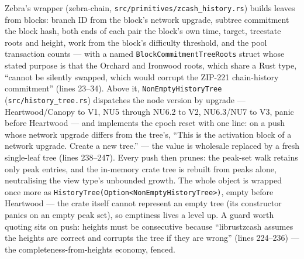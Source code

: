 \documentclass[11pt,a4paper]{article}
\theoremstyle{definition}
\begin{document}
Zebra's wrapper (\textsf{zebra-chain},
\texttt{src/primitives/zcash\_history.rs}) builds leaves from blocks:
branch ID from the block's network upgrade, subtree commitment the block
hash, both ends of each pair the block's own time, target, treestate
roots and height, work from the block's difficulty threshold, and the
pool transaction counts --- with a named
\texttt{BlockCommitmentTreeRoots} struct whose stated purpose is that
the Orchard and Ironwood roots, which share a Rust type, ``cannot be
silently swapped, which would corrupt the ZIP-221 chain-history
commitment'' (lines 23--34). Above it,
\texttt{NonEmptyHistoryTree} (\texttt{src/history\_tree.rs}) dispatches
the node version by upgrade --- Heartwood/Canopy to V1, NU5 through
NU6.2 to V2, NU6.3/NU7 to V3, panic before Heartwood --- and implements
the epoch reset with one line: on a push whose network upgrade differs
from the tree's, ``This is the activation block of a network upgrade.
Create a new tree.'' --- the value is wholesale replaced by a fresh
single-leaf tree (lines 238--247). Every push then prunes: the peak-set
walk retains only peak entries, and the in-memory crate tree is rebuilt
from peaks alone, neutralising the view type's unbounded growth. The
whole object is wrapped once more as
\texttt{HistoryTree(Option<NonEmptyHistoryTree>)}, empty before
Heartwood --- the crate itself cannot represent an empty tree (its
constructor panics on an empty peak set), so emptiness lives a level up.
A guard worth quoting sits on push: heights must be consecutive because
``librustzcash assumes the heights are correct and corrupts the tree if
they are wrong'' (lines 224--236) --- the completeness-from-heights
economy, fenced.
\end{document}
